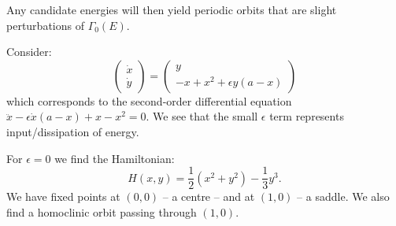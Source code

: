 \documentclass[../Main.tex]{subfiles}
\begin{document}
Any candidate energies will then yield periodic orbits that are slight perturbations of $\Gamma_0(E)$.
\begin{example}
    Consider:
    \begin{equation*}
        \begin{pmatrix}\dot{x} \\ \dot y\end{pmatrix} = \begin{pmatrix}y \\ -x+x^2 + \epsilon y (a - x)\end{pmatrix}
    \end{equation*}
    which corresponds to the second-order differential equation $\ddot x - \epsilon \dot x (a-x) + x - x^2 = 0$. We see that the small $\epsilon$ term represents input/dissipation of energy.

    For $\epsilon = 0$ we find the Hamiltonian:
    \begin{equation*}
        H(x, y) = \frac12 (x^2 + y^2) - \frac13 y^3.
    \end{equation*}
    We have fixed points at $(0, 0)$ -- a centre -- and at $(1, 0)$ -- a saddle. We also find a homoclinic orbit passing through $(1, 0)$.


\end{example}
\end{document}
